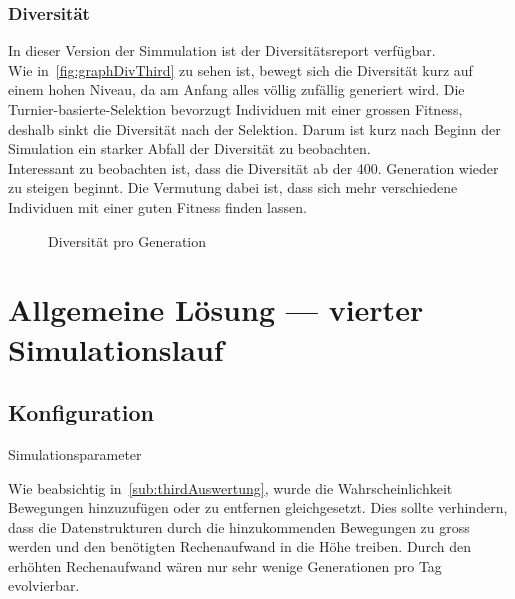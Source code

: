       \subsubsection{Diversität}

        In dieser Version der Simmulation ist der Diversitätsreport verfügbar.
        \\
        Wie in~\vref{fig:graphDivThird} zu sehen ist, bewegt sich die Diversität kurz auf einem hohen Niveau,
        da am Anfang alles völlig zufällig generiert wird.
        Die Turnier-basierte-Selektion bevorzugt Individuen mit einer grossen Fitness,
        deshalb sinkt die Diversität nach der Selektion.
        Darum ist kurz nach Beginn der Simulation ein starker Abfall der Diversität zu beobachten.
        \\
        Interessant zu beobachten ist, dass die Diversität ab der 400. Generation wieder zu steigen beginnt.
        Die Vermutung dabei ist, dass sich mehr verschiedene Individuen mit einer guten Fitness finden lassen.

        \begin{figure}[H]
          \centering
          
          \caption{Diversität pro Generation\label{fig:graphDivThird}}
        \end{figure}

  \section{Allgemeine Lösung --- vierter Simulationslauf\label{sec:4lauf}}

    \subsection{Konfiguration}

      \begin{table}[H]
        \centering
        
        \caption{Simulationsparameter\label{tbl:forthRunConf}}
      \end{table}

      Wie beabsichtig in~\vref{sub:thirdAuswertung},
      wurde die Wahrscheinlichkeit Bewegungen hinzuzufügen oder zu entfernen gleichgesetzt.
      Dies sollte verhindern, dass die Datenstrukturen durch die hinzukommenden Bewegungen zu gross werden
      und den benötigten Rechenaufwand in die Höhe treiben.
      Durch den erhöhten Rechenaufwand wären nur sehr wenige Generationen pro Tag evolvierbar.


